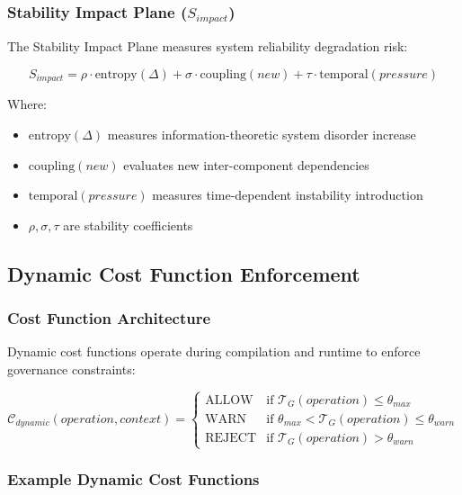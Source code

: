 \subsubsection{Stability Impact Plane ($S_{impact}$)}

The Stability Impact Plane measures system reliability degradation risk:

\begin{equation}
S_{impact} = \rho \cdot \text{entropy}(\Delta) + \sigma \cdot \text{coupling}(new) + \tau \cdot \text{temporal}(pressure)
\end{equation}

Where:
\begin{itemize}
    \item $\text{entropy}(\Delta)$ measures information-theoretic system disorder increase
    \item $\text{coupling}(new)$ evaluates new inter-component dependencies
    \item $\text{temporal}(pressure)$ measures time-dependent instability introduction
    \item $\rho, \sigma, \tau$ are stability coefficients
\end{itemize}

\subsection{Dynamic Cost Function Enforcement}

\subsubsection{Cost Function Architecture}

Dynamic cost functions operate during compilation and runtime to enforce governance constraints:

\begin{equation}
\mathcal{C}_{dynamic}(operation, context) = \begin{cases}
\text{ALLOW} & \text{if } \mathcal{T}_G(operation) \leq \theta_{max} \\
\text{WARN} & \text{if } \theta_{max} < \mathcal{T}_G(operation) \leq \theta_{warn} \\
\text{REJECT} & \text{if } \mathcal{T}_G(operation) > \theta_{warn}
\end{cases}
\end{equation}

\subsubsection{Example Dynamic Cost Functions}

